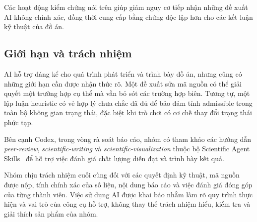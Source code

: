 Các hoạt động kiểm chứng nói trên giúp giảm nguy cơ tiếp nhận những đề xuất AI không chính xác, đồng thời cung cấp bằng chứng độc lập hơn cho các kết luận kỹ thuật của đồ án.

\subsection{Giới hạn và trách nhiệm}

AI hỗ trợ đáng kể cho quá trình phát triển và trình bày đồ án, nhưng cũng có những giới hạn cần được nhận thức rõ. Một đề xuất sửa mã nguồn có thể giải quyết một trường hợp cụ thể mà vẫn bỏ sót các trường hợp biên. Tương tự, một lập luận heuristic có vẻ hợp lý chưa chắc đã đủ để bảo đảm tính admissible trong toàn bộ không gian trạng thái, đặc biệt khi trò chơi có cơ chế thay đổi trạng thái phức tạp.

Bên cạnh Codex, trong vòng rà soát báo cáo, nhóm có tham khảo các hướng dẫn \textit{peer-review}, \textit{scientific-writing} và \textit{scientific-visualization} thuộc bộ Scientific Agent Skills~\cite{scientificagentskills2026} để hỗ trợ việc đánh giá chất lượng diễn đạt và trình bày kết quả.

Nhóm chịu trách nhiệm cuối cùng đối với các quyết định kỹ thuật, mã nguồn được nộp, tính chính xác của số liệu, nội dung báo cáo và việc đánh giá đóng góp của từng thành viên. Việc sử dụng AI được khai báo nhằm làm rõ quy trình thực hiện và vai trò của công cụ hỗ trợ, không thay thế trách nhiệm hiểu, kiểm tra và giải thích sản phẩm của nhóm.
